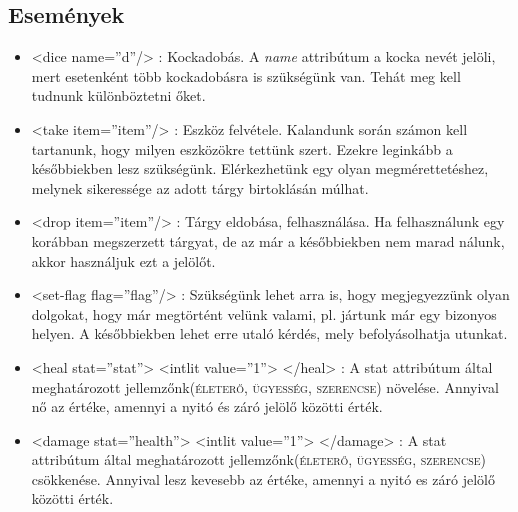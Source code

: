 \documentclass[12pt,a4paper,oneside]{report}
\newcommand{\stat}{\textsc}
\newcommand{\attr}{\emph}
\begin{document}
    \subsection{Események}
      \begin{itemize}
        \item <{\color{Tag}dice} {\color{Attr}name}={\color{Value}''d''}/>
          : Kockadobás. A \attr{name} attribútum a kocka nevét jelöli, mert
          esetenként több kockadobásra is szükségünk van. Tehát meg kell
          tudnunk különböztetni őket.
    
        \item <{\color{Tag}take}
          {\color{Attr}item}={\color{Value}''item''}/> : Eszköz
          felvétele. Kalandunk során számon kell tartanunk, hogy milyen
          eszközökre tettünk szert. Ezekre leginkább a későbbiekben lesz
          szükségünk. Elérkezhetünk egy olyan megmérettetéshez, melynek
          sikeressége az adott tárgy birtoklásán múlhat.
    
        \item <{\color{Tag}drop}
          {\color{Attr}item}={\color{Value}''item''}/> : Tárgy eldobása,
          felhasználása. Ha felhasználunk egy korábban megszerzett
          tárgyat, de az már a későbbiekben nem marad nálunk, akkor
          használjuk ezt a jelölőt.
    
        \item <{\color{Tag}set-flag}
          {\color{Attr}flag}={\color{Value}''flag''}/> : Szükségünk
          lehet arra is, hogy megjegyezzünk olyan dolgokat, hogy már
          megtörtént velünk valami, pl. jártunk már egy bizonyos
          helyen. A későbbiekben lehet erre utaló kérdés, mely
          befolyásolhatja utunkat.
          
        \item <{\color{Tag}heal}
          {\color{Attr}stat}={\color{Value}''stat}''>
          <{\color{Tag}intlit} {\color{Attr}value}={\color{Value}''1''}>
          <{\color{Tag}/heal}> : A stat attribútum által meghatározott
          jellemzőnk(\stat{életerő}, \stat{ügyesség}, \stat{szerencse})
          növelése. Annyival nő az értéke, amennyi a nyitó és záró
          jelölő közötti érték.
          
        \item <{\color{Tag}damage}
          {\color{Attr}stat}={\color{Value}''health''}>
          <{\color{Tag}intlit} {\color{Attr}value}={\color{Value}''1''}>
          <{\color{Tag}/damage}> : A stat attribútum által meghatározott
          jellemzőnk(\stat{életerő}, \stat{ügyesség}, \stat{szerencse})
          csökkenése. Annyival lesz kevesebb az értéke, amennyi a nyitó
          es záró jelölő közötti érték.
    

\end{itemize}
\end{document}
